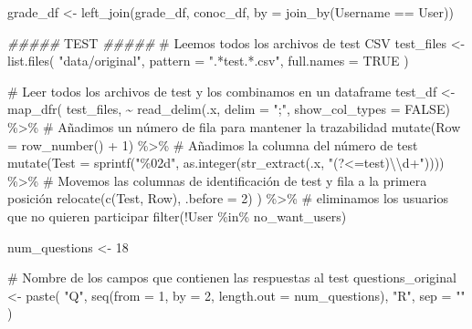 \documentclass[
  12pt,
  a4paper,
  extrafontsizes,
  onecolumn,
  openright]{memoir}
\newenvironment{Shaded}{\begin{snugshade}}{\end{snugshade}}
\newcommand{\AlertTok}[1]{\textcolor[rgb]{0.68,0.00,0.00}{#1}}
\newcommand{\AttributeTok}[1]{\textcolor[rgb]{0.40,0.45,0.13}{#1}}
\newcommand{\CommentTok}[1]{\textcolor[rgb]{0.37,0.37,0.37}{#1}}
\newcommand{\ConstantTok}[1]{\textcolor[rgb]{0.56,0.35,0.01}{#1}}
\newcommand{\DecValTok}[1]{\textcolor[rgb]{0.68,0.00,0.00}{#1}}
\newcommand{\DocumentationTok}[1]{\textcolor[rgb]{0.37,0.37,0.37}{\textit{#1}}}
\newcommand{\FunctionTok}[1]{\textcolor[rgb]{0.28,0.35,0.67}{#1}}
\newcommand{\NormalTok}[1]{\textcolor[rgb]{0.00,0.23,0.31}{#1}}
\newcommand{\OtherTok}[1]{\textcolor[rgb]{0.00,0.23,0.31}{#1}}
\newcommand{\SpecialCharTok}[1]{\textcolor[rgb]{0.37,0.37,0.37}{#1}}
\newcommand{\StringTok}[1]{\textcolor[rgb]{0.13,0.47,0.30}{#1}}
\begin{document}
\begin{Shaded}
\begin{Highlighting}[]
\NormalTok{grade\_df }\OtherTok{\textless{}{-}} \FunctionTok{left\_join}\NormalTok{(grade\_df, conoc\_df, }\AttributeTok{by =} \FunctionTok{join\_by}\NormalTok{(Username }\SpecialCharTok{==}\NormalTok{ User))}

\DocumentationTok{\#\#\#\#\# }\AlertTok{TEST}\DocumentationTok{ \#\#\#\#\#}
\CommentTok{\# Leemos todos los archivos de test CSV}
\NormalTok{test\_files }\OtherTok{\textless{}{-}} \FunctionTok{list.files}\NormalTok{(}
    \StringTok{"data/original"}\NormalTok{, }\AttributeTok{pattern =} \StringTok{".*test.*.csv"}\NormalTok{, }\AttributeTok{full.names =} \ConstantTok{TRUE}
\NormalTok{)}

\CommentTok{\# Leer todos los archivos de test y los combinamos en un dataframe}
\NormalTok{test\_df }\OtherTok{\textless{}{-}} \FunctionTok{map\_dfr}\NormalTok{(}
\NormalTok{    test\_files, }\SpecialCharTok{\textasciitilde{}} \FunctionTok{read\_delim}\NormalTok{(.x, }\AttributeTok{delim =} \StringTok{";"}\NormalTok{, }\AttributeTok{show\_col\_types =} \ConstantTok{FALSE}\NormalTok{) }\SpecialCharTok{\%\textgreater{}\%}
        \CommentTok{\# Añadimos un número de fila para mantener la trazabilidad}
        \FunctionTok{mutate}\NormalTok{(}\AttributeTok{Row =} \FunctionTok{row\_number}\NormalTok{() }\SpecialCharTok{+} \DecValTok{1}\NormalTok{) }\SpecialCharTok{\%\textgreater{}\%} 
        \CommentTok{\# Añadimos la columna del número de test}
        \FunctionTok{mutate}\NormalTok{(}\AttributeTok{Test =} \FunctionTok{sprintf}\NormalTok{(}\StringTok{"\%02d"}\NormalTok{, }\FunctionTok{as.integer}\NormalTok{(}\FunctionTok{str\_extract}\NormalTok{(.x, }\StringTok{"(?\textless{}=test)}\SpecialCharTok{\textbackslash{}\textbackslash{}}\StringTok{d+"}\NormalTok{)))) }\SpecialCharTok{\%\textgreater{}\%}
        \CommentTok{\# Movemos las columnas de identificación de test y fila a la primera posición}
        \FunctionTok{relocate}\NormalTok{(}\FunctionTok{c}\NormalTok{(Test, Row), }\AttributeTok{.before =} \DecValTok{2}\NormalTok{) }
\NormalTok{) }\SpecialCharTok{\%\textgreater{}\%}
    \CommentTok{\# eliminamos los usuarios que no quieren participar}
    \FunctionTok{filter}\NormalTok{(}\SpecialCharTok{!}\NormalTok{User }\SpecialCharTok{\%in\%}\NormalTok{ no\_want\_users) }

\NormalTok{num\_questions }\OtherTok{\textless{}{-}} \DecValTok{18}

\CommentTok{\# Nombre de los campos que contienen las respuestas al test}
\NormalTok{questions\_original }\OtherTok{\textless{}{-}} \FunctionTok{paste}\NormalTok{(}
    \StringTok{"Q"}\NormalTok{, }\FunctionTok{seq}\NormalTok{(}\AttributeTok{from =} \DecValTok{1}\NormalTok{, }\AttributeTok{by =} \DecValTok{2}\NormalTok{, }\AttributeTok{length.out =}\NormalTok{ num\_questions), }\StringTok{"R"}\NormalTok{, }\AttributeTok{sep =} \StringTok{""}
\NormalTok{) }


\end{Highlighting}
\end{Shaded}
\end{document}
